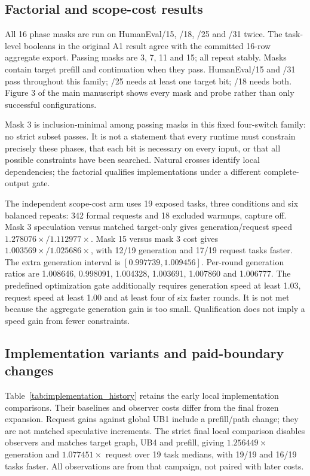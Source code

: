 \subsection{Factorial and scope-cost results}
All 16 phase masks are run on HumanEval/15, /18, /25 and /31 twice. The task-level booleans in the original A1 result agree with the committed 16-row aggregate export. Passing masks are 3, 7, 11 and 15; all repeat stably. Masks contain target prefill and continuation when they pass. HumanEval/15 and /31 pass throughout this family; /25 needs at least one target bit; /18 needs both. Figure 3 of the main manuscript shows every mask and probe rather than only successful configurations.

Mask 3 is inclusion-minimal among passing masks in this fixed four-switch family: no strict subset passes. It is not a statement that every runtime must constrain precisely these phases, that each bit is necessary on every input, or that all possible constraints have been searched. Natural crosses identify local dependencies; the factorial qualifies implementations under a different complete-output gate.

The independent scope-cost arm uses 19 exposed tasks, three conditions and six balanced repeats: 342 formal requests and 18 excluded warmups, capture off. Mask 3 speculation versus matched target-only gives generation/request speed $1.278076\times/1.112977\times$. Mask 15 versus mask 3 cost gives $1.003569\times/1.025686\times$, with 12/19 generation and 17/19 request tasks faster. The extra generation interval is $[0.997739,1.009456]$. Per-round generation ratios are 1.008646, 0.998091, 1.004328, 1.003691, 1.007860 and 1.006777. The predefined optimization gate additionally requires generation speed at least 1.03, request speed at least 1.00 and at least four of six faster rounds. It is not met because the aggregate generation gain is too small. Qualification does not imply a speed gain from fewer constraints.

\subsection{Implementation variants and paid-boundary changes}
Table~\ref{tab:implementation_history} retains the early local implementation comparisons. Their baselines and observer costs differ from the final frozen expansion. Request gains against global UB1 include a prefill/path change; they are not matched speculative increments. The strict final local comparison disables observers and matches target graph, UB4 and prefill, giving $1.256449\times$ generation and $1.077451\times$ request over 19 task medians, with 19/19 and 16/19 tasks faster. All observations are from that campaign, not paired with later costs.

